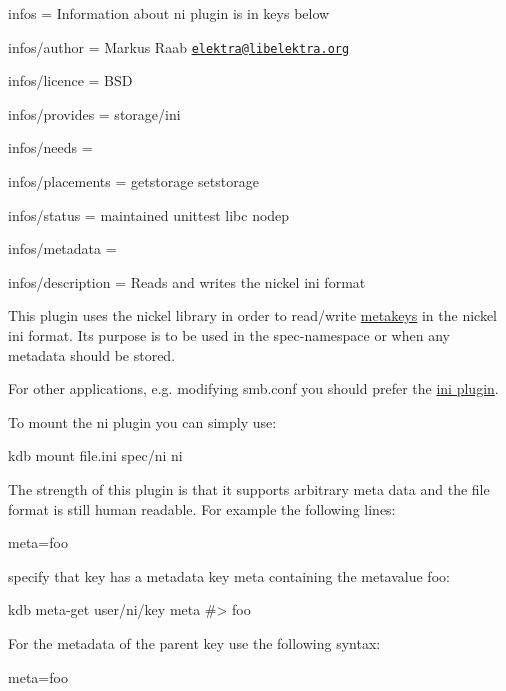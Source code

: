 
\begin{DoxyItemize}
\item infos = Information about ni plugin is in keys below
\item infos/author = Markus Raab \href{mailto:elektra@libelektra.org}{\tt elektra@libelektra.\+org}
\item infos/licence = B\+SD
\item infos/provides = storage/ini
\item infos/needs =
\item infos/placements = getstorage setstorage
\item infos/status = maintained unittest libc nodep
\item infos/metadata =
\item infos/description = Reads and writes the nickel ini format
\end{DoxyItemize}

This plugin uses the nickel library in order to read/write \hyperlink{doc_help_elektra-metadata_md}{metakeys} in the nickel ini format. It\textquotesingle{}s purpose is to be used in the {\ttfamily spec}-\/namespace or when any metadata should be stored.

For other applications, e.\+g. modifying {\ttfamily smb.\+conf} you should prefer the \hyperlink{autotoc_md289_src_plugins_ini_README_md}{ini plugin}.

To mount the ni plugin you can simply use\+:


\begin{DoxyCode}
kdb mount file.ini spec/ni ni
\end{DoxyCode}


The strength of this plugin is that it supports arbitrary meta data and the file format is still human readable. For example the following lines\+:


\begin{DoxyCode}
[key]
meta=foo
\end{DoxyCode}


specify that {\ttfamily key} has a metadata key {\ttfamily meta} containing the metavalue {\ttfamily foo}\+:


\begin{DoxyCode}
kdb meta-get user/ni/key meta
#> foo
\end{DoxyCode}


For the metadata of the parent key use the following syntax\+:


\begin{DoxyCode}
[]
meta=foo
\end{DoxyCode}


